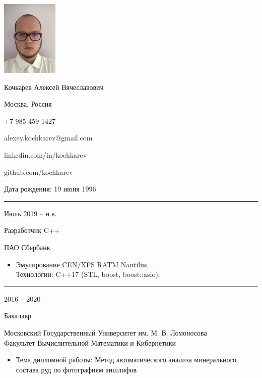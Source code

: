 \documentclass[a4paper,10pt]{article}
\newlength{\cvcolumngapwidth}
\newlength{\cvleftcolumnwidth}
\newlength{\cvrightcolumnwidth}
\newcommand{\cvnamestyle}[1]{{\Large\cvnamefont\textcolor{cvnamecolor}{#1}}}
\newcommand{\cvsectionstyle}[1]{{\normalsize\cvsectionfont\textcolor{cvsectioncolor}{#1}}}
\newcommand{\cvtitlestyle}[1]{{\large\cvtitlefont\textcolor{cvtitlecolor}{#1}}}
\newcommand{\cvdurationstyle}[1]{{\small\cvdurationfont\textcolor{cvdurationcolor}{#1}}}
\newlength{\cvafteritemskipamount}
\newlength{\cvaftersectionskipamount}
\newlength{\cvafternameskipamount}
\newlength{\cvafterpersonalinfolineskipamount}
\newlength{\cvaftertitleskipamount}
\newlength{\cvparskip}
\newcommand{\cvpersonalinfo}[2]{
    \begin{minipage}[t]{\cvleftcolumnwidth}
        \vspace{0mm} %
        \raggedleft #1
    \end{minipage}%
    \hspace{\cvcolumngapwidth}%
    \begin{minipage}[t]{\cvrightcolumnwidth}
        \vspace{0mm} %
        #2
    \end{minipage}

    \vspace{\cvafteritemskipamount}
}
\newcommand{\cvname}[1]{
    \cvnamestyle{#1}

    \vspace{\cvafternameskipamount}
}
\newcommand{\cvpersonalinfolinewithicon}[3]{
    \raisebox{.5\fontcharht\font`E-.5\height}{\texttt{[image: \#2]}}
    #3

    \vspace{\cvafterpersonalinfolineskipamount}
}
\newcommand{\cvsection}[1]{
    \begin{minipage}[t]{\cvleftcolumnwidth}
        \raggedleft\cvsectionstyle{#1}
    \end{minipage}%
    \hspace{\cvcolumngapwidth}%
    \begin{minipage}[t]{\cvrightcolumnwidth}
        \textcolor{cvrulecolor}{\rule{\cvrightcolumnwidth}{0.3mm}}
    \end{minipage}

    \vspace{\cvaftersectionskipamount}
}
\newcommand{\cvitem}[2]{
    \begin{minipage}[t]{\cvleftcolumnwidth}
        \raggedleft #1
    \end{minipage}%
    \hspace{\cvcolumngapwidth}%
    \begin{minipage}[t]{\cvrightcolumnwidth}
        \setlength{\parskip}{\cvparskip} #2
    \end{minipage}

    \vspace{\cvafteritemskipamount}
}
\newcommand{\cvtitle}[1]{
    \cvtitlestyle{#1}

    \vspace{\cvaftertitleskipamount}
    \vspace{-\cvparskip}
}
\begin{document}

\cvpersonalinfo{
    \includegraphics[height=36mm]{me.jpg}
}{
    \cvname{Кочкарев Алексей Вячеславович}

    \cvpersonalinfolinewithicon{height=4mm}{072-location.pdf}{
        Москва, Россия
    }

    \cvpersonalinfolinewithicon{height=4mm}{067-phone.pdf}{
        +7 985 459 1427
    }

    \cvpersonalinfolinewithicon{height=4mm}{070-envelop.pdf}{
        alexey.kochkarev@gmail.com
    }

    \cvpersonalinfolinewithicon{height=4mm}{458-linkedin.pdf}{
        linkedin.com/in/kochkarev
    }
    
    \cvpersonalinfolinewithicon{height=4mm}{github_logo.pdf}{
        github.com/kochkarev
    }

    Дата рождения: 19 июня 1996
}



\cvsection{ОПЫТ РАБОТЫ}

\cvitem{
    \cvdurationstyle{Июль 2019 -- н.в.}
}{
    \cvtitle{Разработчик C++}

    ПАО Сбербанк

    \begin{itemize}[leftmargin=*]
        \item Эмулирование CEN/XFS RATM Nautilus.\\ Технологии: C++17 (STL, boost, boost::asio).
    \end{itemize}
}



\cvsection{ОБРАЗОВАНИЕ}

\cvitem{
    \cvdurationstyle{2016 -- 2020}
}{
    \cvtitle{Бакалавр}

    Московский Государственный Университет им. М. В. Ломоносова \\ Факультет Вычислительной Математики и Кибернетики

    \begin{itemize}[leftmargin=*]
        \item Тема дипломной работы: Метод автоматического анализа минерального\\ состава руд по фотографиям аншлифов
    \end{itemize}
}
\end{document}
